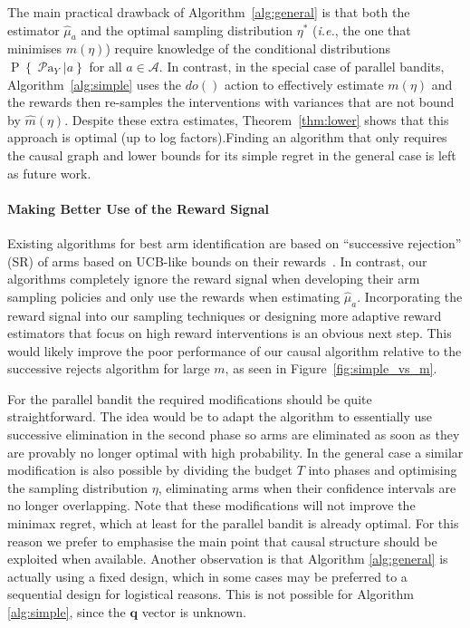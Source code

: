 \documentclass[11pt,a4paper,oneside]{book}
\newcommand{\Pn}[2]{\operatorname{P}\left\{#2|#1\right\}}
\newcommand{\calA}{\mathcal A}
\newcommand{\ie}{\textit{i.e.}}
\newcommand{\parents}[1]{\operatorname{\mathcal{P}a}_{#1}}
\renewcommand{\vec}[1]{\boldsymbol{#1}}
\theoremstyle{plain}
\theoremstyle{definition}
\begin{document}
The main practical drawback of Algorithm~\ref{alg:general} is that both the estimator $\hat{\mu}_a$ and the optimal sampling distribution $\eta^*$ (\ie, the one that minimises $m(\eta)$) require knowledge of the conditional distributions $\Pn{a}{\parents{Y}}$ for all $a \in \calA$. In contrast, in the special case of parallel bandits, Algorithm~\ref{alg:simple} uses the $do()$ action to effectively estimate $m(\eta)$ and the rewards then re-samples the interventions with variances that are not bound by $\hat{m}(\eta)$.
Despite these extra estimates, Theorem~\ref{thm:lower} shows that this approach is optimal (up to log factors).Finding an algorithm that only requires the causal graph and lower bounds for its simple regret in the general case is left as future work.


\paragraph{Making Better Use of the Reward Signal}
Existing algorithms for best arm identification are based on ``successive rejection'' (SR) of arms based on UCB-like bounds on their rewards~\citep{Even-Dar2002}. In contrast, our algorithms completely ignore the reward signal when developing their arm sampling policies and only use the rewards when estimating $\hat{\mu}_a$. Incorporating the reward signal into our sampling techniques or designing more adaptive reward estimators that focus on high reward interventions is an obvious next step. This would likely improve the poor performance of our causal algorithm relative to the successive rejects algorithm for large $m$, as seen in Figure~\ref{fig:simple_vs_m}.

For the parallel bandit the required modifications should be quite straightforward. The idea would be to adapt the algorithm to essentially use successive elimination in the second phase so arms are eliminated as soon as they are provably no longer optimal with high probability. In the general case a similar modification is also possible by dividing the budget $T$ into phases and optimising the sampling distribution $\eta$, eliminating arms when their confidence intervals are no longer overlapping. Note that these modifications will not improve the minimax regret, which at least for the parallel bandit is already optimal. For this reason we prefer to emphasise the main point that causal structure should be exploited when available. Another observation is that Algorithm \ref{alg:general} is actually using a fixed design, which in some cases may be preferred to a sequential design for logistical reasons. This is not possible for Algorithm \ref{alg:simple}, since the $\vec{q}$ vector is unknown.
\end{document}

